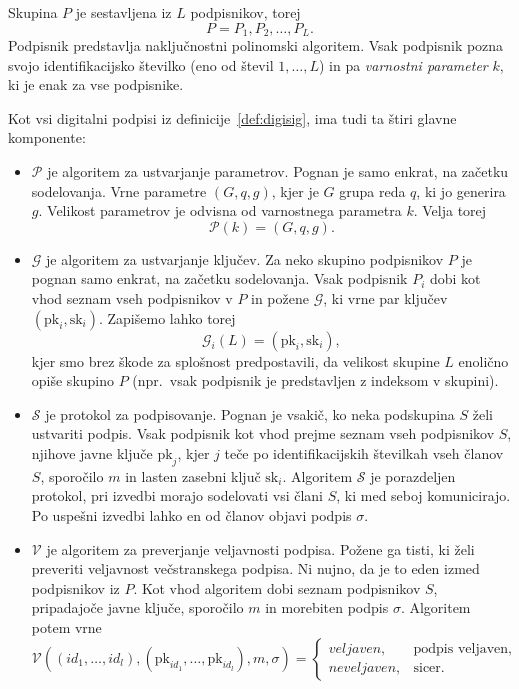\documentclass[isrm2, tisk]{fmfdelo}
\begin{document}
\begin{definicija}
\label{def:asm}
    Skupina $P$ je sestavljena iz $L$ podpisnikov, torej
    $$
    P = P_1, P_2, \dots, P_L.
    $$
    Podpisnik predstavlja naključnostni polinomski algoritem. Vsak podpisnik pozna svojo 
    identifikacijsko številko (eno od števil $1, \dots, L$) in pa \textit{varnostni parameter} $k$,
    ki je enak za vse podpisnike.

    Kot vsi digitalni podpisi iz definicije~\ref{def:digisig}, ima tudi ta štiri glavne komponente:
    \begin{itemize}
        \item $\mathcal{P}$ je algoritem za ustvarjanje parametrov. Pognan je samo enkrat, na začetku
            sodelovanja. Vrne parametre $(G, q, g)$, kjer je $G$ grupa reda $q$, ki jo generira
            $g$. Velikost parametrov je odvisna od varnostnega parametra $k$. Velja torej
            $$
            \mathcal{P}(k) = (G, q, g).
            $$
        \item $\mathcal{G}$ je algoritem za ustvarjanje ključev. Za neko skupino podpisnikov $P$ je pognan samo
            enkrat, na začetku sodelovanja. Vsak podpisnik $P_i$ dobi kot vhod seznam vseh podpisnikov v $P$
            in požene $\mathcal{G}$, ki vrne par ključev $(\text{pk}_i, \text{sk}_i)$. Zapišemo lahko torej
            $$
            \mathcal{G}_i(L) = (\text{pk}_i, \text{sk}_i),
            $$
            kjer smo brez škode za splošnost predpostavili, da velikost skupine $L$ enolično opiše
            skupino $P$ (npr.\ vsak podpisnik je predstavljen z indeksom v skupini).
        \item $\mathcal{S}$ je protokol za podpisovanje. Pognan je vsakič, ko neka podskupina $S$ želi
            ustvariti podpis. Vsak podpisnik kot vhod prejme seznam vseh podpisnikov $S$, njihove
            javne ključe $\text{pk}_j$, kjer $j$ teče po identifikacijskih številkah vseh članov $S$,
            sporočilo $m$ in lasten zasebni ključ $\text{sk}_i$. Algoritem $\mathcal{S}$ je porazdeljen
            protokol, pri izvedbi morajo sodelovati vsi člani $S$, ki med seboj komunicirajo. Po
            uspešni izvedbi lahko en od članov objavi podpis $\sigma$.
        \item $\mathcal{V}$ je algoritem za preverjanje veljavnosti podpisa. Požene ga tisti, ki želi 
            preveriti veljavnost večstranskega podpisa. Ni nujno, da je to eden izmed podpisnikov iz $P$. 
            Kot vhod algoritem dobi seznam podpisnikov $S$, pripadajoče javne ključe, sporočilo $m$ in 
            morebiten podpis $\sigma$. Algoritem potem vrne
            $$ 
            \mathcal{V}((id_1, \dots, id_l), (\text{pk}_{id_1}, \dots, \text{pk}_{id_l}), m, \sigma) = 
            \begin{cases}
                veljaven, & \text{podpis veljaven}, \\
                neveljaven, & \text{sicer}.
            \end{cases}
            $$
    \end{itemize}
\end{definicija}
\end{document}
